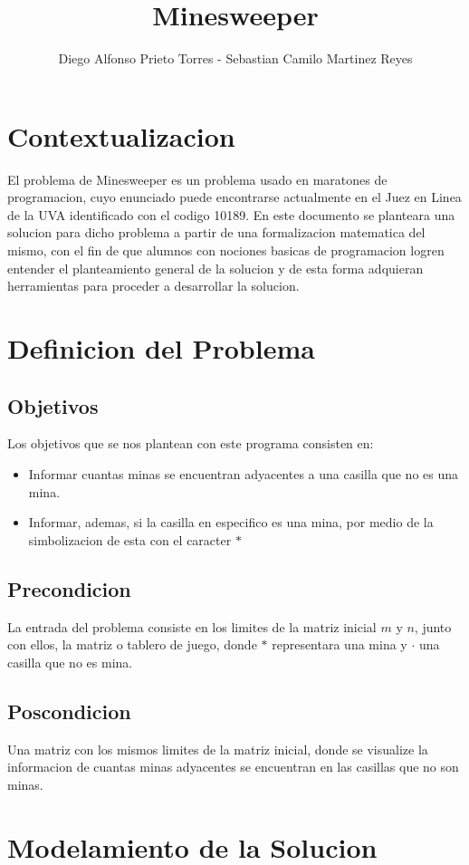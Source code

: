 \documentclass[12pt]{article}
\begin{document}
\title{Minesweeper}
\author{Diego Alfonso Prieto Torres - Sebastian Camilo Martinez Reyes}
\maketitle
\tableofcontents
\section{Contextualizacion}
El problema de Minesweeper es un problema usado en maratones de programacion, cuyo enunciado puede encontrarse actualmente en el Juez en Linea de la UVA identificado con el codigo 10189. En este documento se planteara una solucion para dicho problema a partir de una formalizacion matematica del mismo, con el fin de que alumnos con nociones basicas de programacion logren entender el planteamiento general de la solucion y de esta forma adquieran herramientas para proceder a desarrollar la solucion. 
\section{Definicion del Problema}
\subsection{Objetivos}
Los objetivos que se nos plantean con este programa consisten en:
\begin{itemize}
\item Informar cuantas minas se encuentran adyacentes a una casilla que no es una mina.
\item Informar, ademas, si la casilla en especifico es una mina, por medio de la simbolizacion de esta con el caracter $\ast$
\end{itemize}
\subsection{Precondicion}
La entrada del problema consiste en los limites de la matriz inicial $m$ y $n$, junto con ellos, la matriz o tablero de juego, donde $\ast$ representara una mina y $\cdot$ una casilla que no es mina. 
\subsection{Poscondicion}
Una matriz con los mismos limites de la matriz inicial, donde se visualize la informacion de cuantas minas adyacentes se encuentran en las casillas que no son minas.
\section{Modelamiento de la Solucion}
\end{document}
